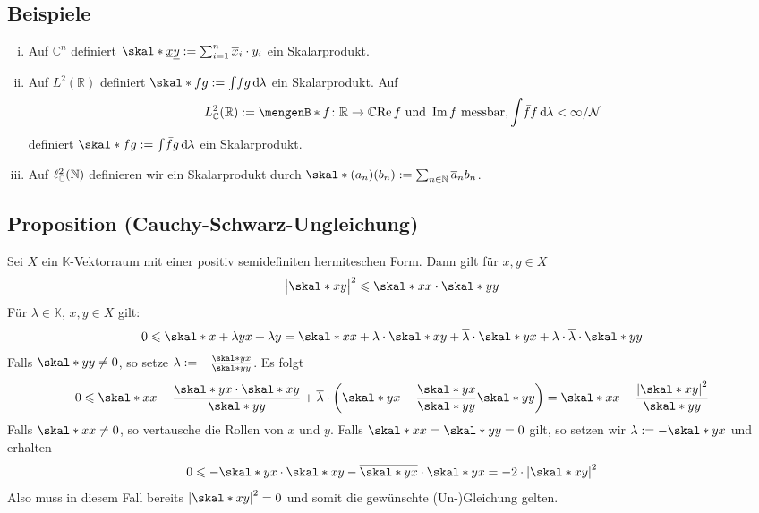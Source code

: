 \subsection[Beispiele für hermitesche Formen]{Beispiele} %
\label{sub:73}
\begin{enumerate}[(i)]
	\item Auf $\mathds{C}^n$ definiert $\skal*{\underline{x}}{\underline{y}} := \sum_{i=1}^{n} \overline{x}_i \cdot y_i$ ein Skalarprodukt.
	\item Auf $L^2(\mathds{R})$ definiert $\skal*{f}{g} := \int\! f  g \,\mathd\lambda$ ein Skalarprodukt.
	Auf
	\[
		L^2_\mathds{C}(\mathds{R}) := \set[f \colon \mathds{R} \to \mathds{C}]{\re f \text{ und } \im f \text{ messbar}, \int \! \bar{f} f\, \mathd\lambda < \infty } / \mathcal{N}
	\]
	definiert $\skal*{f}{g} := \int\! \bar{f} g \, \mathd\lambda$ ein Skalarprodukt.
	\item Auf $\ell^2_{\color{gray}\mathds{C}}(\mathds{N})$ definieren wir ein Skalarprodukt durch $\skal*{(a_n)}{(b_n)} := \sum_{n \in \mathds{N}} \overline{a}_n b_n$.
\end{enumerate}

\subsection{Proposition (Cauchy-Schwarz-Ungleichung)} %
\label{sub:74}
Sei $X$ ein $\mathds{K}$-Vektorraum mit einer positiv semidefiniten hermiteschen Form. Dann gilt für $x,y \in X$ 
\[
	\abs[\big]{\skal*{x}{y}}^2 \le \skal*{x}{x} \cdot \skal*{y}{y}
\]
Für $\lambda \in \mathds{K}$, $x,y \in X$ gilt: 
\begin{align*}
	0 \le \skal*{x+\lambda y}{x + \lambda y} = \skal*{x}{x} + \lambda \cdot \skal*{x}{y} + \overline{\lambda} \cdot \skal*{y}{x} 
	+ \lambda \cdot \overline{\lambda} \cdot \skal*{y}{y}  
\end{align*}
Falls $\skal*{y}{y} \not=0$, so setze $\lambda := - \frac{\skal*{y}{x}}{\skal*{y}{y}}$. Es folgt 
\begin{align*}
	0 \le \skal*{x}{x} - \frac{\skal*{y}{x} \cdot \skal*{x}{y}}{\skal*{y}{y}} + \overline{\lambda} \cdot \enbrace*{\skal*{y}{x}  
	- \frac{\skal*{y}{x}}{\skal*{y}{y}} \skal*{y}{y}   } = \skal*{x}{x} - \frac{\abs*{\skal*{x}{y}}^2 }{\skal*{y}{y}} 
\end{align*}
Falls $\skal*{x}{x} \not= 0$, so vertausche die Rollen von $x$ und $y$. Falls $\skal*{x}{x}=\skal*{y}{y}=0$ gilt, so setzen wir $\lambda := - \skal*{y}{x}$ und erhalten
\[
	0 \le - \skal*{y}{x} \cdot \skal*{x}{y} - \overline{\skal*{y}{x}} \cdot \skal*{y}{x} = -2 \cdot \abs*{\skal*{x}{y}}^2 
\]
Also muss in diesem Fall bereits $\abs*{\skal*{x}{y}}^2 =0$ und somit die gewünschte (Un-)Gleichung gelten. \bewende

